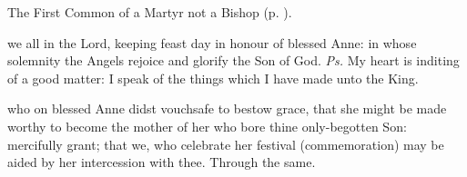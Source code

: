\vspace{-0.1\baselineskip}


\begin{rubric}
	The First Common of a Martyr not a Bishop (p. \pageref{CommonMartyrNotBishopI}).
\end{rubric}



\vspace{-0.2\baselineskip}

\introit

\vspace{-0.1\baselineskip}

 we all in the Lord, keeping feast day in honour of blessed Anne: in whose solemnity the Angels rejoice and glorify the Son of God. \textit{Ps.} My heart is inditing of a good matter: I speak of the things which I have made unto the King.

\vspace{-0.2\baselineskip}

\collect

\vspace{-0.1\baselineskip}

 who on blessed Anne didst vouchsafe to bestow grace, that she might be made worthy to become the mother of her who bore thine only-begotten Son: mercifully grant; that we, who celebrate her festival (commemoration) may be aided by her intercession with thee. Through the same.

\vspace{-0.2\baselineskip}


\vspace{-0.1\baselineskip}

